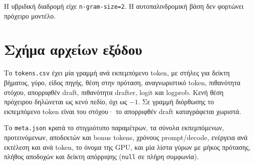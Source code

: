 \documentclass[a4paper,12pt]{report}
\theoremstyle{plain}
\theoremstyle{definition}
\theoremstyle{remark}
\begin{document}
Η υβριδική διαδρομή είχε \texttt{n-gram-size=2}. Η αυτοπαλινδρομική βάση δεν
φορτώνει πρόχειρο μοντέλο.

\chapter{Σχήμα αρχείων εξόδου}
\label{app:schema}

Το \texttt{tokens.csv} έχει μία γραμμή ανά εκπεμπόμενο token, με στήλες για
δείκτη βήματος, γύρο, είδος πηγής, θέση στην πρόταση, αναγνωριστικό token,
πιθανότητα στόχου, απορριφθέν draft, πιθανότητα drafter, logit και logprob.
Κενή θέση πρόχειρου δηλώνεται ως κενό πεδίο, όχι ως \(-1\). Σε γραμμή
διόρθωσης το εκπεμπόμενο token είναι του στόχου· το απορριφθέν draft
καταγράφεται χωριστά.

Το \texttt{meta.json} κρατά το στιγμιότυπο παραμέτρων, τα σύνολα εκπεμπόμενων,
προτεινόμενων, αποδεκτών και bonus tokens, χρόνους prompt/decode, ενέργεια
ανά εκτέλεση και ανά token, το όνομα της GPU, και μία λίστα γύρων με μήκος
πρότασης, πλήθος αποδοχών και δείκτη απόρριψης (\texttt{null} σε πλήρη
συμφωνία).

{\sloppy
\printbibliography[heading=bibintoc]}
\end{document}
